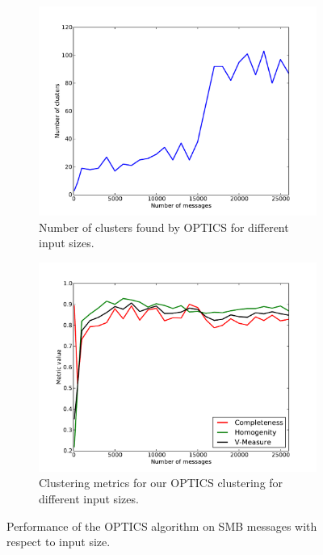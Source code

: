 \documentclass[a4paper]{report}
\begin{document}
\begin{figure}[h]
    \centering
    \begin{subfigure}[t]{0.48\textwidth}
        \includegraphics[width=\textwidth]{img/num_optics}
        \caption{Number of clusters found by OPTICS for different input sizes.}
        \label{fig:num_optics}
    \end{subfigure}
    \quad
    \begin{subfigure}[t]{0.48\textwidth}
        \includegraphics[width=\textwidth]{img/metrics_optics}
        \caption{Clustering metrics for our OPTICS clustering for different
            input sizes.}
        \label{fig:metrics_optics}
    \end{subfigure}
    \caption{Performance of the OPTICS algorithm on SMB messages with respect
        to input size.}
    \label{fig:optics_res}
\end{figure}
\end{document}
